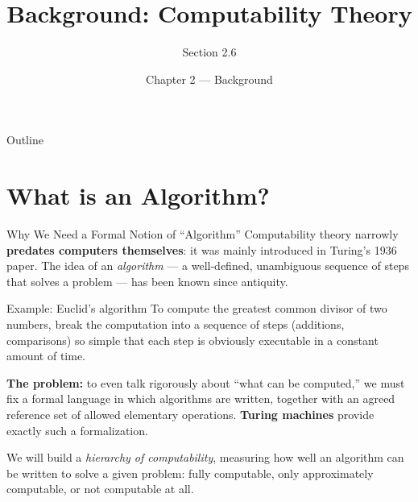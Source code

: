 \documentclass[aspectratio=169,10pt]{beamer}
\title{Background: Computability Theory}
\subtitle{Section 2.6}
\author{Chapter 2 --- Background}
\institute{An Introduction to Universal Artificial Intelligence \\ \small Hutter, Quarel, Catt (2024)}
\date{}
\begin{document}
\begin{frame}
  \titlepage
\end{frame}

\begin{frame}{Outline}
  \tableofcontents
\end{frame}

\section{What is an Algorithm?}

\begin{frame}{Why We Need a Formal Notion of ``Algorithm''}
  Computability theory narrowly \textbf{predates computers themselves}: it was
  mainly introduced in Turing's 1936 paper. The idea of an \emph{algorithm} ---
  a well-defined, unambiguous sequence of steps that solves a problem --- has
  been known since antiquity.

  \begin{block}{Example: Euclid's algorithm}
    To compute the greatest common divisor of two numbers, break the computation
    into a sequence of steps (additions, comparisons) so simple that each step
    is obviously executable in a constant amount of time.
  \end{block}

  \textbf{The problem:} to even talk rigorously about ``what can be computed,''
  we must fix a formal language in which algorithms are written, together with
  an agreed reference set of allowed elementary operations. \textbf{Turing
  machines} provide exactly such a formalization.

  \vspace{2mm}
  We will build a \emph{hierarchy of computability}, measuring how well an
  algorithm can be written to solve a given problem: fully computable, only
  approximately computable, or not computable at all.
\end{frame}
\end{document}
